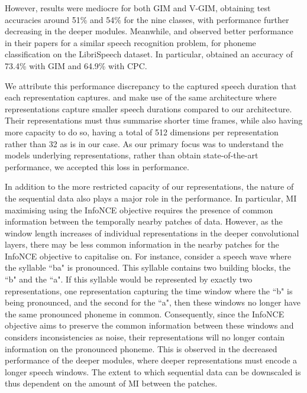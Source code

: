 	However, results were mediocre for both GIM and V-GIM, obtaining test accuracies around 51\% and 54\% for the nine classes, with performance further decreasing in the deeper modules. Meanwhile, \cite{oordRepresentationLearningContrastive2019} and \cite{lowePuttingEndEndtoEnd2020a} observed better performance in their papers for a similar speech recognition problem, for phoneme classification on the LibriSpeech dataset. In particular, \citeauthor{lowePuttingEndEndtoEnd2020a} obtained an accuracy of 73.4\% with GIM and 64.9\% with CPC.
	
	We attribute this performance discrepancy to the captured speech duration that each representation captures. \citeauthor{lowePuttingEndEndtoEnd2020a} and \citeauthor{oordRepresentationLearningContrastive2019} make use of the same architecture where representations capture smaller speech durations compared to our architecture. Their representations must thus summarise shorter time frames, while also having more capacity to do so, having a total of 512 dimensions per representation rather than 32 as is in our case. As our primary focus was to understand the models underlying representations, rather than obtain state-of-the-art performance, we accepted this loss in performance.
	
	In addition to the more restricted capacity of our representations, the nature of the sequential data also plays a major role in the performance. In particular, MI maximising using the InfoNCE objective requires the presence of common information between the temporally nearby patches of data. However, as the window length increases of individual representations in the deeper convolutional layers, there may be less common information in the nearby patches for the InfoNCE objective to capitalise on. For instance, consider a speech wave where the syllable ``ba" is pronounced. This syllable contains two building blocks, the ``b" and the ``a". If this syllable would be represented by exactly two
	representations, one representation capturing the time window where the ``b" is being pronounced, and the second for the ``a", then these windows no longer have the same pronounced phoneme in common. Consequently, since the InfoNCE objective aims to preserve the common information between these windows and considers inconsistencies as noise, their representations will no longer contain information on the pronounced phoneme. This is observed in the decreased performance of the deeper modules, where deeper representations must encode a longer speech windows. The extent to which sequential data can be downscaled is thus dependent on the amount of MI between the patches.
	
